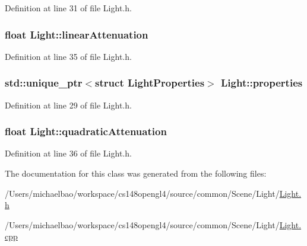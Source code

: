 Definition at line 31 of file Light.\+h.

\hypertarget{class_light_afcb2da592197efae015ae16c1c5bfceb}{}
\subsubsection[{linear\+Attenuation}]{\setlength{\rightskip}{0pt plus 5cm}float Light\+::linear\+Attenuation\hspace{0.3cm}{\ttfamily [private]}}\label{class_light_afcb2da592197efae015ae16c1c5bfceb}


Definition at line 35 of file Light.\+h.

\hypertarget{class_light_a74eba4cac1cc27e741230fbda32fceef}{}
\subsubsection[{properties}]{\setlength{\rightskip}{0pt plus 5cm}std\+::unique\+\_\+ptr$<$struct {\bf Light\+Properties}$>$ Light\+::properties\hspace{0.3cm}{\ttfamily [private]}}\label{class_light_a74eba4cac1cc27e741230fbda32fceef}


Definition at line 29 of file Light.\+h.

\hypertarget{class_light_a0f24dde11cbbd12d0f0309e189f3640c}{}
\subsubsection[{quadratic\+Attenuation}]{\setlength{\rightskip}{0pt plus 5cm}float Light\+::quadratic\+Attenuation\hspace{0.3cm}{\ttfamily [private]}}\label{class_light_a0f24dde11cbbd12d0f0309e189f3640c}


Definition at line 36 of file Light.\+h.



The documentation for this class was generated from the following files\+:\begin{DoxyCompactItemize}
\item 
/\+Users/michaelbao/workspace/cs148opengl4/source/common/\+Scene/\+Light/\hyperlink{_light_8h}{Light.\+h}\item 
/\+Users/michaelbao/workspace/cs148opengl4/source/common/\+Scene/\+Light/\hyperlink{_light_8cpp}{Light.\+cpp}\end{DoxyCompactItemize}
